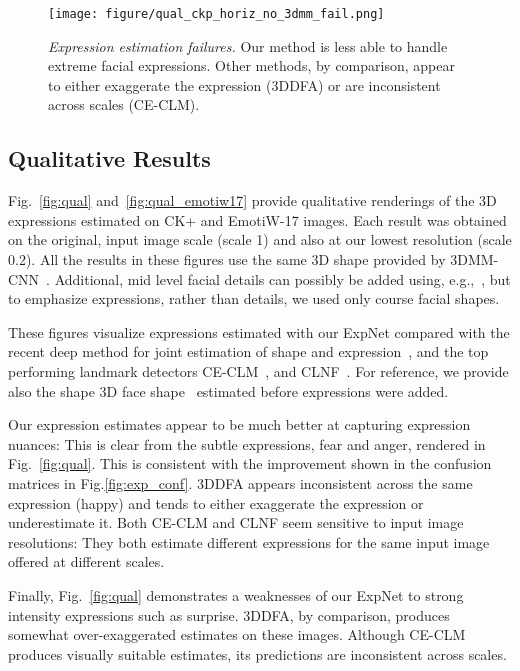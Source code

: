 \documentclass[a4paper, 10pt, conference]{ieeeconf}
\begin{document}
\begin{figure}[tb]
\centering
\texttt{[image: figure/qual\_ckp\_horiz\_no\_3dmm\_fail.png]}
\caption{
{\em Expression estimation failures.} Our method is less able to handle extreme facial expressions. Other methods, by comparison, appear to either exaggerate the expression (3DDFA) or are inconsistent across scales (CE-CLM).
}
\label{fig:qual_fail}
\end{figure}

\subsection{Qualitative Results}\label{sec:qual}
Fig.~\ref{fig:qual} and~\ref{fig:qual_emotiw17} provide qualitative renderings of the 3D expressions estimated on CK+ and EmotiW-17 images. Each result was obtained on the original, input image scale (scale 1) and also at our lowest resolution (scale 0.2). All the results in these figures use the same 3D shape provided by 3DMM-CNN~\cite{tran16_3dmm_cnn}. Additional, mid level facial details can possibly be added using, e.g.,~\cite{tran2017extreme}, but to emphasize expressions, rather than details, we used only course facial shapes.

These figures visualize expressions estimated with our ExpNet compared with the recent deep method for joint estimation of shape and expression~\cite{zhu2015}, and the top performing landmark detectors CE-CLM~\cite{zadeh2016deep}, and CLNF~\cite{baltrusaitis2013constrained}. For reference, we provide also the shape 3D face  shape~\cite{tran16_3dmm_cnn} estimated before expressions were added.


Our expression estimates appear to be much better at capturing expression nuances: This is clear from the subtle expressions, fear and anger, rendered in Fig.~\ref{fig:qual}. This is consistent with the improvement shown in the confusion matrices in Fig.\ref{fig:exp_conf}. 3DDFA appears inconsistent across the same expression (happy) and tends to either exaggerate the expression or underestimate it. Both CE-CLM and CLNF seem sensitive to input image resolutions: They both estimate different expressions for the same input image offered at different scales.

Finally, Fig.~\ref{fig:qual} demonstrates a weaknesses of our ExpNet to strong intensity expressions such as surprise. 3DDFA, by comparison, produces somewhat over-exaggerated estimates on these images. Although CE-CLM produces visually suitable estimates, its predictions are inconsistent across scales.
\end{document}
